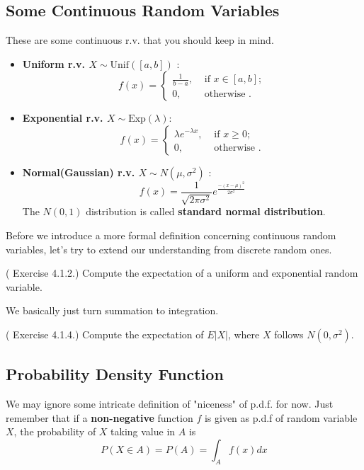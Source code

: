 \subsection{Some Continuous Random Variables}
These are some continuous r.v. that you should keep in mind.  
\begin{itemize}
    \item \textbf{Uniform r.v. \(X \sim \text{Unif}([a,b])\) }:\\
        \[
            f(x) = \begin{cases}
                \frac{1}{b-a}, &\text{ if } x \in [a,b] ;\\
                0, &\text{ otherwise }  .
            \end{cases}
        \]
    \item \textbf{Exponential r.v. \(X \sim \text{Exp}(\lambda )  \)}: \\
    \[
        f(x) = \begin{cases}
            \lambda e^{-\lambda x}, &\text{ if } x\geq 0 ;\\
            0 , &\text{ otherwise }  .
        \end{cases}
    \]
    \item \textbf{Normal(Gaussian) r.v. \(X \sim N(\mu ,\sigma^2) \) }: \\   
    \[
        f(x) = \frac{1}{\sqrt{2 \pi \sigma^2 }} e^{\frac{-(x-\mu )^2}{2 \sigma^2}}
    \]
    The \(N(0,1)\) distribution is called \textbf{standard normal distribution}.   
\end{itemize}

Before we introduce a more formal definition concerning continuous random variables, let's try to extend our understanding from discrete random ones. 
\begin{eg}
    (\cite{IntroPanchenko} Exercise 4.1.2.) Compute the expectation of a uniform and
exponential random variable.
\end{eg}
We basically just turn summation to integration. 

\begin{exercise}
    (\cite{IntroPanchenko} Exercise 4.1.4.) Compute the expectation of \(E |X|\), where \(X\) follows \(N(0,\sigma^2)\).  
\end{exercise}
\subsection{Probability Density Function}
We may ignore some intricate definition of "niceness" of p.d.f. for now. Just remember that if a \textbf{non-negative} function \(f\) is given as p.d.f of random variable \(X\), 
the probability of \(X\) taking value in \(A\) is 
\[
    P(X \in A) = P(A) = \int_A f(x)dx
\] 

